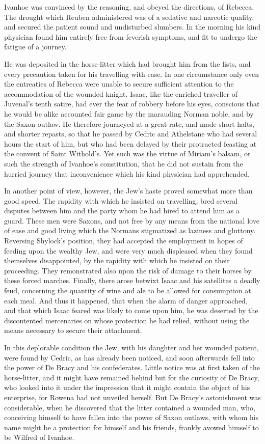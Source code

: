 Ivanhoe was convinced by the reasoning, and obeyed the directions, of
Rebecca. The drought which Reuben administered was of a sedative and
narcotic quality, and secured the patient sound and undisturbed
slumbers. In the morning his kind physician found him entirely free from
feverish symptoms, and fit to undergo the fatigue of a journey.

He was deposited in the horse-litter which had brought him from the
lists, and every precaution taken for his travelling with ease. In one
circumstance only even the entreaties of Rebecca were unable to secure
sufficient attention to the accommodation of the wounded knight. Isaac,
like the enriched traveller of Juvenal's tenth satire, had ever the fear
of robbery before his eyes, conscious that he would be alike accounted
fair game by the marauding Norman noble, and by the Saxon outlaw. He
therefore journeyed at a great rate, and made short halts, and shorter
repasts, so that he passed by Cedric and Athelstane who had several
hours the start of him, but who had been delayed by their protracted
feasting at the convent of Saint Withold's. Yet such was the virtue of
Miriam's balsam, or such the strength of Ivanhoe's constitution, that he
did not sustain from the hurried journey that inconvenience which his
kind physician had apprehended.

In another point of view, however, the Jew's haste proved somewhat more
than good speed. The rapidity with which he insisted on travelling, bred
several disputes between him and the party whom he had hired to attend
him as a guard. These men were Saxons, and not free by any means from
the national love of ease and good living which the Normans stigmatized
as laziness and gluttony. Reversing Shylock's position, they had
accepted the employment in hopes of feeding upon the wealthy Jew, and
were very much displeased when they found themselves disappointed, by
the rapidity with which he insisted on their proceeding. They
remonstrated also upon the risk of damage to their horses by these
forced marches. Finally, there arose betwixt Isaac and his satellites a
deadly feud, concerning the quantity of wine and ale to be allowed for
consumption at each meal. And thus it happened, that when the alarm of
danger approached, and that which Isaac feared was likely to come upon
him, he was deserted by the discontented mercenaries on whose protection
he had relied, without using the means necessary to secure their
attachment.

In this deplorable condition the Jew, with his daughter and her wounded
patient, were found by Cedric, as has already been noticed, and soon
afterwards fell into the power of De Bracy and his confederates. Little
notice was at first taken of the horse-litter, and it might have
remained behind but for the curiosity of De Bracy, who looked into it
under the impression that it might contain the object of his enterprise,
for Rowena had not unveiled herself. But De Bracy's astonishment was
considerable, when he discovered that the litter contained a wounded
man, who, conceiving himself to have fallen into the power of Saxon
outlaws, with whom his name might be a protection for himself and his
friends, frankly avowed himself to be Wilfred of Ivanhoe.

